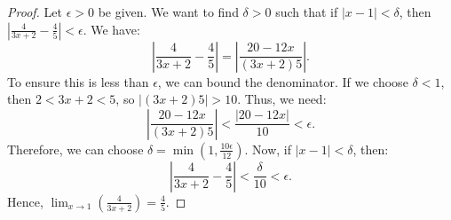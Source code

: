 \documentclass[12pt]{article}
\begin{document}
\begin{enumerate}[label=(\alph*)]
    \begin{proof}
      Let $\epsilon > 0$ be given. We want to find $\delta > 0$ such that if $|x - 1| < \delta$, then $\left|\frac{4}{3x + 2} - \frac{4}{5}\right| < \epsilon$.
      We have:
      \[\left|\frac{4}{3x + 2} - \frac{4}{5}\right| = \left|\frac{20 - 12x}{(3x + 2)5}\right|.\]
      To ensure this is less than $\epsilon$, we can bound the denominator. 
      If we choose $\delta < 1$, then $2 < 3x + 2 < 5$, so $|(3x + 2)5| > 10$.
      Thus, we need:
      \[\left|\frac{20 - 12x}{(3x + 2)5}\right| < \frac{|20 - 12x|}{10} < \epsilon.\]
      Therefore, we can choose $\delta = \min(1, \frac{10\epsilon}{12})$.
      Now, if $|x - 1| < \delta$, then:
      \[\left|\frac{4}{3x + 2} - \frac{4}{5}\right| < \frac{\delta}{10} < \epsilon.\]
      Hence, $\lim_{x \to 1}(\frac{4}{3x+2}) = \frac{4}{5}$.
    \end{proof}
  
  \end{enumerate}
  \newpage
\end{document}
